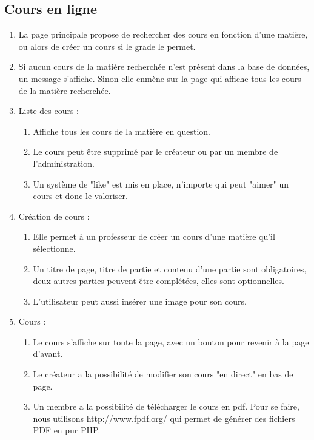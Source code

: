 \documentclass[12pt,a4paper]{article}
\begin{document}
\subsection{Cours en ligne}
\begin{enumerate}
    \item La page principale propose de rechercher des cours en fonction d'une matière, ou alors de créer un cours si le grade le permet.
    \item Si aucun cours de la matière recherchée n'est présent dans la base de données, un message s'affiche. Sinon elle enmène sur la page qui affiche tous les cours de la matière recherchée.
    \item Liste des cours :
    \begin{enumerate}
        \item Affiche tous les cours de la matière en question.
        \item Le cours peut être supprimé par le créateur ou par un membre de l'administration.
        \item Un système de "like" est mis en place, n'importe qui peut "aimer" un cours et donc le valoriser.
    \end{enumerate}
    \item Création de cours :
    \begin{enumerate}
        \item Elle permet à un professeur de créer un cours d'une matière qu'il sélectionne.
        \item Un titre de page, titre de partie et contenu d'une partie sont obligatoires, deux autres parties peuvent être complétées, elles sont optionnelles.
        \item L'utilisateur peut aussi insérer une image pour son cours.
    \end{enumerate}
    \item Cours :
    \begin{enumerate}
        \item Le cours s'affiche sur toute la page, avec un bouton pour revenir à la page d'avant.
        \item Le créateur a la possibilité de modifier son cours "en direct" en bas de page.
        \item Un membre a la possibilité de télécharger le cours en pdf. Pour se faire, nous utilisons http://www.fpdf.org/ qui permet de générer des fichiers PDF en pur PHP.
    \end{enumerate}
\end{enumerate}
\end{document}
